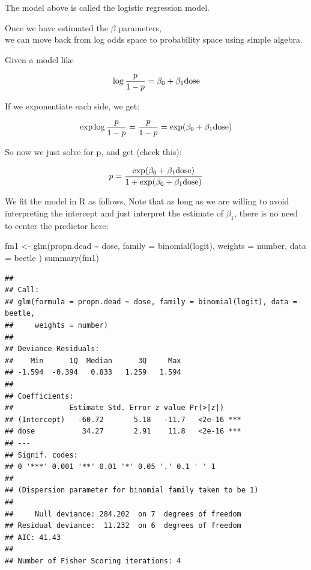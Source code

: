 \documentclass[
  12pt,
]{krantz}
\newenvironment{Shaded}{\begin{snugshade}}{\end{snugshade}}
\newcommand{\AttributeTok}[1]{\textcolor[rgb]{0.77,0.63,0.00}{#1}}
\newcommand{\FunctionTok}[1]{\textcolor[rgb]{0.00,0.00,0.00}{#1}}
\newcommand{\NormalTok}[1]{#1}
\newcommand{\OtherTok}[1]{\textcolor[rgb]{0.56,0.35,0.01}{#1}}
\newcommand{\SpecialCharTok}[1]{\textcolor[rgb]{0.00,0.00,0.00}{#1}}
\theoremstyle{definition}
\theoremstyle{definition}
\theoremstyle{definition}
\theoremstyle{definition}
\theoremstyle{remark}
\begin{document}
The model above is called the logistic regression model.

Once we have estimated the \(\beta\) parameters,\\
we can move back from log odds space to probability space using simple algebra.

Given a model like

\begin{equation}
\log \frac{p}{1-p} = \beta_0 + \beta_1 \hbox{dose}
\end{equation}

If we exponentiate each side, we get:

\begin{equation}
\exp \log \frac{p}{1-p} = \frac{p}{1-p} = \exp( \beta_0 + \beta_1 \hbox{dose})
\end{equation}

So now we just solve for p, and get (check this):

\begin{equation} \label{problogisticregression}
p = \frac{\exp( \beta_0 + \beta_1 \hbox{dose})}{1+\exp( \beta_0 + \beta_1 \hbox{dose})}
\end{equation}

We fit the model in R as follows. Note that as long as we are willing to avoid interpreting the intercept and just interpret the estimate of \(\beta_1\), there is no need to center the predictor here:

\begin{Shaded}
\begin{Highlighting}[]
\NormalTok{fm1 }\OtherTok{\textless{}{-}} \FunctionTok{glm}\NormalTok{(propn.dead }\SpecialCharTok{\textasciitilde{}}\NormalTok{ dose,}
  \AttributeTok{family =} \FunctionTok{binomial}\NormalTok{(logit),}
  \AttributeTok{weights =}\NormalTok{ number,}
  \AttributeTok{data =}\NormalTok{ beetle}
\NormalTok{)}
\FunctionTok{summary}\NormalTok{(fm1)}
\end{Highlighting}
\end{Shaded}

\begin{verbatim}
## 
## Call:
## glm(formula = propn.dead ~ dose, family = binomial(logit), data = beetle, 
##     weights = number)
## 
## Deviance Residuals: 
##    Min      1Q  Median      3Q     Max  
## -1.594  -0.394   0.833   1.259   1.594  
## 
## Coefficients:
##             Estimate Std. Error z value Pr(>|z|)    
## (Intercept)   -60.72       5.18   -11.7   <2e-16 ***
## dose           34.27       2.91    11.8   <2e-16 ***
## ---
## Signif. codes:  
## 0 '***' 0.001 '**' 0.01 '*' 0.05 '.' 0.1 ' ' 1
## 
## (Dispersion parameter for binomial family taken to be 1)
## 
##     Null deviance: 284.202  on 7  degrees of freedom
## Residual deviance:  11.232  on 6  degrees of freedom
## AIC: 41.43
## 
## Number of Fisher Scoring iterations: 4
\end{verbatim}
\end{document}

